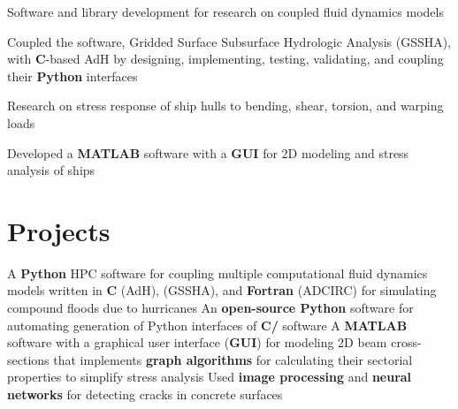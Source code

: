 \documentclass[letterpaper,10pt]{article}
\begin{document}
 
        \resumeItemListStart
            {Software and library development for research on coupled
            fluid dynamics models}

            {Coupled the \textbf{\CC{}} software, Gridded Surface Subsurface
            Hydrologic Analysis (GSSHA), with \textbf{C}-based AdH by
            designing, implementing, testing, validating, and coupling their
            \textbf{Python} interfaces}
       \resumeItemListEnd

 
        \resumeItemListStart
            {Research on stress response of ship hulls to bending, shear,
            torsion, and warping loads}

            {Developed a \textbf{MATLAB} software with a \textbf{GUI} for 2D
            modeling and stress analysis of ships}
        \resumeItemListEnd
  \resumeSubHeadingListEnd

\section{Projects}
  \resumeSubItemListStart
      {A \textbf{Python} HPC software for coupling multiple computational fluid
      dynamics models written in \textbf{C} (AdH), \textbf{\CC{}} (GSSHA), and
      \textbf{Fortran} (ADCIRC) for simulating compound floods due to hurricanes}
      {An \textbf{open-source Python} software for automating
      generation of Python interfaces of \textbf{C/\CC{}} software}
      {A \textbf{MATLAB} software with a graphical user interface (\textbf{GUI})
      for modeling 2D beam cross-sections that implements \textbf{graph
      algorithms} for calculating their sectorial properties to simplify stress
      analysis}
      {Used \textbf{image processing} and \textbf{neural networks} for detecting
      cracks in concrete surfaces}
  \resumeSubItemListEnd
\end{document}
